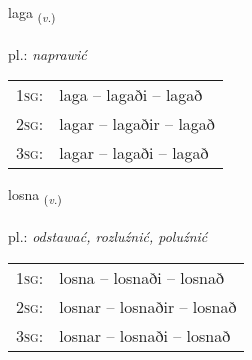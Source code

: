 \documentclass[frontgrid, backgrid]{flacards}\usepackage[]{graphicx}\usepackage[]{xcolor}
\begin{document}
\renewcommand{\flhead}{\vskip5pt \fboxsep=0pt {\small\bfseries\footnotesize Sagnorð | Verb}}
\renewcommand{\fcfoot}{\vskip5pt \fboxsep=0pt \hspace{2pt}{\small\bfseries\footnotesize 2K}}

\renewcommand{\blhead}{\vskip5pt {\small\bfseries\footnotesize Sagnorð | Verb }}
\renewcommand{\bcfoot}{\vskip5pt \hspace{2pt}{\small\bfseries\footnotesize 2K}}


{laga \small{\textsubscript{(\textit{v.})}} \\[1ex] %
\textphonetic{[laːɣa]} \\
pl.: \emph{naprawić} \\  [2ex]
\renewcommand*{\arraystretch}{0.8}
\begin{tabular}{p{1cm}l}
\textsc{1sg}: & laga -- lagaði -- lagað \\ 
\textsc{2sg}: & lagar -- lagaðir -- lagað \\ 
\textsc{3sg}: & lagar -- lagaði -- lagað \\ 
\end{tabular}
}

\renewcommand{\flhead}{\vskip5pt \fboxsep=0pt {\small\bfseries\footnotesize Sagnorð | Verb}}
\renewcommand{\fcfoot}{\vskip5pt \fboxsep=0pt \hspace{2pt}{\small\bfseries\footnotesize 2K}}

\renewcommand{\blhead}{\vskip5pt {\small\bfseries\footnotesize Sagnorð | Verb }}
\renewcommand{\bcfoot}{\vskip5pt \hspace{2pt}{\small\bfseries\footnotesize 2K}}


{losna \small{\textsubscript{(\textit{v.})}} \\[1ex] %
\textphonetic{[lɔstna]} \\
pl.: \emph{odstawać, rozluźnić, poluźnić} \\  [2ex]
\renewcommand*{\arraystretch}{0.8}
\begin{tabular}{p{1cm}l}
\textsc{1sg}: & losna -- losnaði -- losnað \\ 
\textsc{2sg}: & losnar -- losnaðir -- losnað \\ 
\textsc{3sg}: & losnar -- losnaði -- losnað \\ 
\end{tabular}
}
\end{document}
